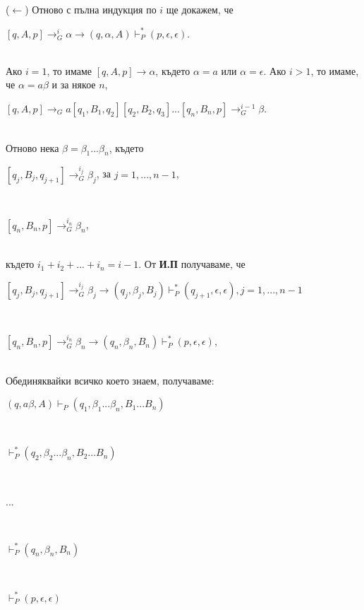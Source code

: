 \documentclass[11pt]{article} %
\begin{document}
{($\leftarrow$) Отново с пълна индукция по $i$ ще докажем, че\\
\centerline{$[q, A,p] \to^{i}_{G}\alpha \rightarrow (q, \alpha, A) \vdash^{*}_{P} (p, \epsilon, \epsilon) $.}\\

Ако $i = 1$, то имаме $[q, A, p] \to \alpha$, където $\alpha = a$ или $\alpha = \epsilon$. Ако $i > 1$, то имаме, че $\alpha = a \beta$ и за някое $n$, \\
\centerline{$[q, A, p] \to_{G} a[q_{1}, B_{1}, q_{2}][q_{2}, B_{2}, q_{3}]...[q_{n}, B_{n}, p] \to^{i-1}_{G} \beta$.}\\

Отново нека $\beta = \beta_{1}...\beta_{n}$, където \\
\centerline{$[q_{j}, B_{j}, q_{j+1}] \to ^{i_j}_{G} \beta_{j}$, за $j = 1, ..., n-1$,}\\
\centerline{$[q_{n}, B_{n}, p] \to ^{i_n}_{G} \beta_{n}$,}\\

където $i_{1} + i_{2} + ... + i_{n} = i - 1$. От \textbf{И.П} получаваме, че \\
\centerline{$[q_{j}, B_{j}, q_{j+1}] \to ^{i_j}_{G} \beta_{j} \rightarrow (q_{j}, \beta_{j}, B_{j}) \vdash^{*}_{P}(q_{j+1}, \epsilon, \epsilon), j = 1, ..., n - 1$}\\
\centerline{$[q_{n}, B_{n}, p] \to ^{i_n}_{G}\beta_{n} \rightarrow (q_{n}, \beta_{n}, B_{n}) \vdash^{*}_{P}(p, \epsilon, \epsilon)$,}\\

Обединяквайки всичко което знаем, получаваме: \\
\centerline{$(q, a \beta, A)\vdash_{P}(q_{1}, \beta_{1}...\beta_{n}, B_{1}...B_{n})$}\\
\centerline{$\vdash^{*}_{P}(q_{2}, \beta_{2}...\beta_{n}, B_{2}...B_{n})$}\\
\centerline{...}\\
\centerline{$\vdash^{*}_{P}(q_{n}, \beta_{n}, B_{n})$}\\
\centerline{$\vdash^{*}_{P}(p, \epsilon, \epsilon)$}\par

}
\end{document}
